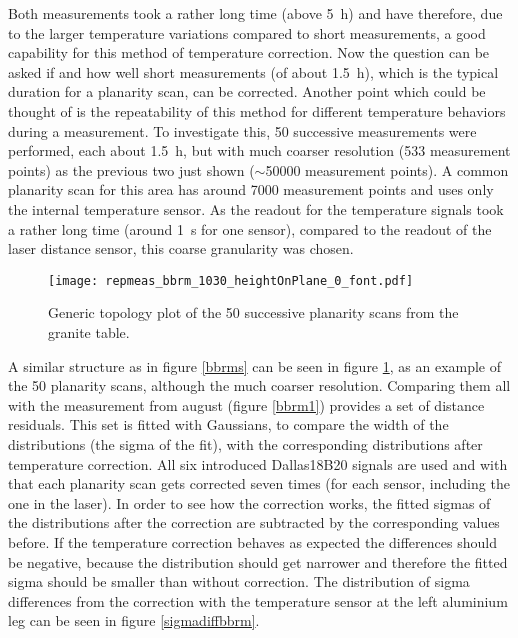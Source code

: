 \documentclass[
a4paper,                                %
twoside,                                %
BCOR1.4cm,                      %
10pt,                           %
headings=normal,                %
headsepline,                    %
clearplainpage, %
final,                                  %
div=14,
parskip=full,
openright,
bibliography=toc
]{scrreprt}
\begin{document}
Both measurements took a rather long time (above \SI{5}{\hour}) and have therefore, due to the larger temperature variations compared to short measurements, a good capability for this method of temperature correction. Now the question can be asked if and how well short measurements (of about \SI{1.5}{\hour}), which is the typical duration for a planarity scan, can be corrected. Another point which could be thought of is the repeatability of this method for different temperature behaviors during a measurement. To investigate this, 50 successive measurements were performed, each about \SI{1.5}{\hour}, but with much coarser resolution (533 measurement points) as the previous two just shown ($\sim$50000 measurement points). A common planarity scan for this area has around 7000 measurement points and uses only the internal temperature sensor. As the readout for the temperature signals took a rather long time (around \SI{1}{\s} for one sensor), compared to the readout of the laser distance sensor, this coarse granularity was chosen.

\begin{figure}[H]
	\centering
	\texttt{[image: repmeas\_bbrm\_1030\_heightOnPlane\_0\_font.pdf]}
	\caption{Generic topology plot of the 50 successive planarity scans from the granite table.}
	\label{toporepmeas}
\end{figure}

A similar structure as in figure \ref{bbrms} can be seen in figure \ref{toporepmeas}, as an example of the 50 planarity scans, although the much coarser resolution. Comparing them all with the measurement from august (figure \ref{bbrm1}) provides a set of distance residuals. This set is fitted with Gaussians, to compare the width of the distributions (the sigma of the fit), with the corresponding distributions after temperature correction. All six introduced Dallas18B20 signals are used and with that each planarity scan gets corrected seven times (for each sensor, including the one in the laser). In order to see how the correction works, the fitted sigmas of the distributions after the correction are subtracted by the corresponding values before. If the temperature correction behaves as expected the differences should be negative, because the distribution should get narrower and therefore the fitted sigma should be smaller than without correction. The distribution of sigma differences from the correction with the temperature sensor at the left aluminium leg can be seen in figure \ref{sigmadiffbbrm}.
\end{document}
